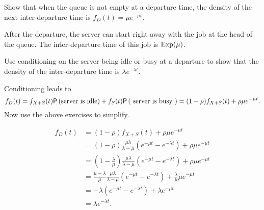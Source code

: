 \begin{extra}
Show that when the queue is not empty at a departure time, the density of the next inter-departure time is $f_D(t) = \mu e^{-\mu t}$.
\begin{solution}
After the departure, the server can start right away with the job at the head of the queue. The inter-departure time of this job is $\operatorname{Exp}(\mu)$.
\end{solution}
\end{extra}

\begin{extra}
Use conditioning on the server being idle or busy at a departure to show that the density of the inter-departure time is $\lambda e^{-\lambda t}$.
\begin{hint}
Conditioning leads to 
\begin{equation*}
 f_D(t) = f_{X+S}(t) \P{\text{server is idle}} + f_S(t) \P{\text{ server is busy }}= (1-\rho) f_{X+S}(t) +
 \rho \mu e^{-\mu t}.
\end{equation*}
 Now use the above exercises to simplify.
\end{hint}
\begin{solution}
 \begin{align*}
 f_D(t) 
&= (1-\rho) f_{X+S}(t) + \rho \mu e^{-\mu t} \\
&= (1-\rho) \frac{\mu\lambda}{\lambda-\mu} \left(e^{-\mu t}-e^{-\lambda t}\right) + \rho \mu e^{-\mu t} \\
&= \left(1-\frac{\lambda}\mu\right) \frac{\mu\lambda}{\lambda-\mu}\left(e^{-\mu t}-e^{-\lambda t}\right) + \rho \mu e^{-\mu t} \\
&= \frac{\mu-\lambda}\mu \frac{\mu\lambda}{\lambda-\mu}\left(e^{-\mu t}-e^{-\lambda t}\right) + \frac\lambda \mu \mu e^{-\mu t} \\
&= - \lambda\left(e^{-\mu t}-e^{-\lambda t}\right) + \lambda e^{-\mu t} \\
&= \lambda e^{-\lambda t}.
 \end{align*}
\end{solution}
\end{extra}






